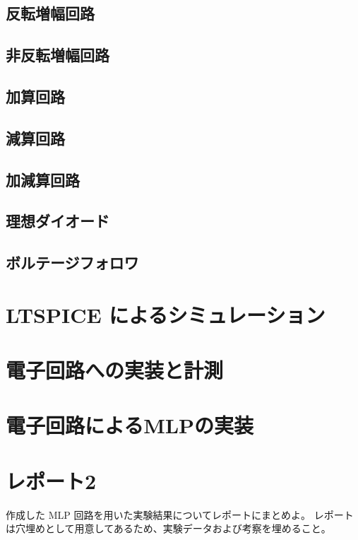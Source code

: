 \subsection{反転増幅回路}

\subsection{非反転増幅回路}

\subsection{加算回路}

\subsection{減算回路}

\subsection{加減算回路}

\subsection{理想ダイオード}

\subsection{ボルテージフォロワ}

\section{LTSPICE によるシミュレーション}





\section{電子回路への実装と計測}





\section{電子回路によるMLPの実装}





\section{レポート2}

作成した MLP 回路を用いた実験結果についてレポートにまとめよ。
レポートは穴埋めとして用意してあるため、実験データおよび考察を埋めること。